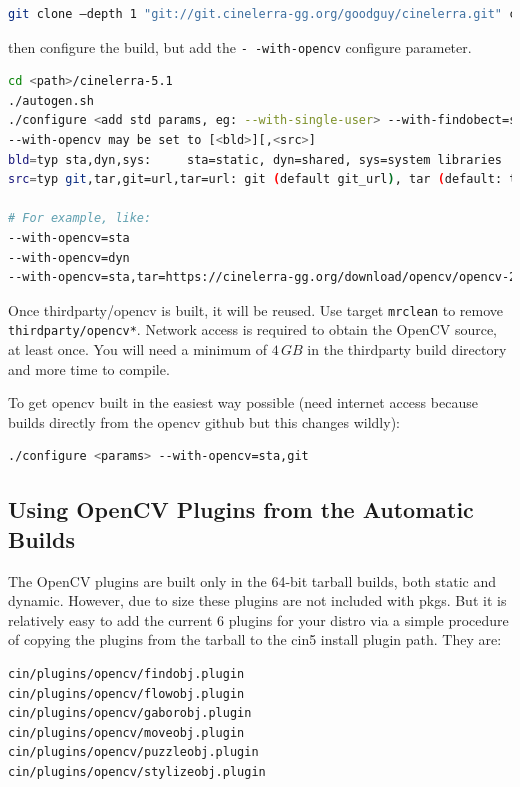 \begin{lstlisting}[language=bash]
git clone –depth 1 "git://git.cinelerra-gg.org/goodguy/cinelerra.git" cinelerra5
\end{lstlisting}

then configure the build, but add the \texttt{- -with-opencv} configure parameter.

\begin{lstlisting}[language=bash]
cd <path>/cinelerra-5.1
./autogen.sh
./configure <add std params, eg: --with-single-user> --with-findobect=sta
--with-opencv may be set to [<bld>][,<src>]
bld=typ sta,dyn,sys:	 sta=static, dyn=shared, sys=system libraries
src=typ git,tar,git=url,tar=url: git (default git_url), tar (default: tar_url)

# For example, like:
--with-opencv=sta
--with-opencv=dyn
--with-opencv=sta,tar=https://cinelerra-gg.org/download/opencv/opencv-20180401.tgz
\end{lstlisting}

Once thirdparty/opencv is built, it will be reused. Use target \texttt{mrclean} to remove \texttt{thirdparty/opencv*}.
Network access is required to obtain the OpenCV source, at least once. You will need a minimum of 
$4\, GB$ in the thirdparty build directory and more time to compile.

To get opencv built in the easiest way possible (need internet access because builds directly from the opencv github but this changes wildly):

\begin{lstlisting}[language=bash]
./configure <params> --with-opencv=sta,git
\end{lstlisting}

\subsection{Using OpenCV Plugins from the Automatic Builds}%
\label{sub:using_opencv_automatic_builds}

The OpenCV plugins are built only in the 64-bit tarball builds, both static and dynamic. However, due to size these plugins are not included with pkgs. But it is relatively easy to add the current 6 plugins for your distro via a simple procedure of copying the plugins from the tarball to the cin5 install plugin path. They are: 

\begin{lstlisting}[language=bash]
cin/plugins/opencv/findobj.plugin 
cin/plugins/opencv/flowobj.plugin
cin/plugins/opencv/gaborobj.plugin
cin/plugins/opencv/moveobj.plugin
cin/plugins/opencv/puzzleobj.plugin
cin/plugins/opencv/stylizeobj.plugin
\end{lstlisting}

